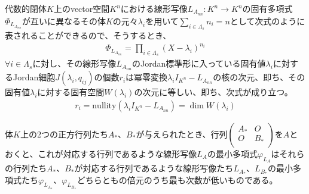 \documentclass[dvipdfmx]{jsarticle}
\begin{document}
\begin{thm*}
代数的閉体$K$上のvector空間$K^{n}$における線形写像$L_{A_{nn}}:K^{n} \rightarrow K^{n}$の固有多項式$\varPhi_{L_{A_{nn}}}$が互いに異なるその体$K$の元々$\lambda_{i}$を用いて$\sum_{i \in \varLambda_{s}} n_{i} = n$として次式のように表されることができるので、そうするとき、
\begin{align*}
\varPhi_{L_{A_{nn}}} = \prod_{i \in \varLambda_{s}} \left( X - \lambda_{i} \right)^{n_{i}}
\end{align*}
$\forall i \in \varLambda_{s}$に対し、その線形写像$L_{A_{nn}}$のJordan標準形に入っている固有値$\lambda_{i}$に対するJordan細胞$J\left( \lambda_{i},q_{ij} \right)$の個数$r_{i}$は冪零変換$\lambda_{i}I_{K^{n}} - L_{A_{nn}}$の核の次元、即ち、その固有値$\lambda_{i}$に対する固有空間$W\left( \lambda_{i} \right)$の次元に等しい、即ち、次式が成り立つ。
\begin{align*}
r_{i} = {\mathrm{nullity}}\left( \lambda_{i}I_{K^{n}} - L_{A_{nn}} \right) = \dim{W\left( \lambda_{i} \right)}
\end{align*}
\end{thm*}
\begin{thm}\label{2.2.8.18}
体$K$上の2つの正方行列たち$A_{*}$、$B_{*}$が与えられたとき、行列$\begin{pmatrix}
A_{*} & O \\
O & B_{*} \\
\end{pmatrix}$を$A$とおくと、これが対応する行列であるような線形写像$L_{A}$の最小多項式$\varphi_{L_{A}}$はそれらの行列たち$A_{*}$、$B_{*}$が対応する行列であるような線形写像たち$L_{A_{*}}$、$L_{B_{*}}$の最小多項式たち$\varphi_{L_{A_{*}}}$、$\varphi_{L_{B_{*}}}$どちらともの倍元のうち最も次数が低いものである。
\end{thm}
\end{document}
